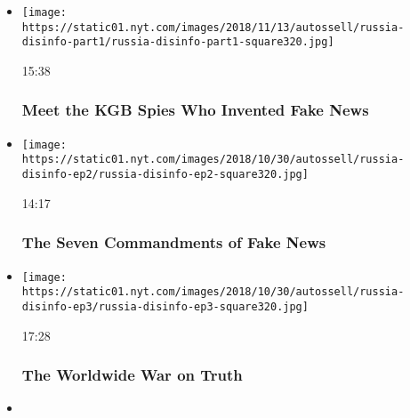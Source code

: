 \begin{itemize}
\item
  \href{https://www.nytimes.com/video/opinion/100000006210828/russia-disinformation-fake-news.html?action=click\&module=video-series-bar\&region=header\&pgtype=Article\&playlistId=video/opinion}{}

  \texttt{[image: https://static01.nyt.com/images/2018/11/13/autossell/russia-disinfo-part1/russia-disinfo-part1-square320.jpg]}

  15:38

  \hypertarget{meet-the-kgb-spies-who-invented-fake-news}{%
  \subsubsection{Meet the KGB Spies Who Invented Fake
  News}\label{meet-the-kgb-spies-who-invented-fake-news}}
\item
  \href{https://www.nytimes.com/video/opinion/100000006188102/what-is-pizzagate.html?action=click\&module=video-series-bar\&region=header\&pgtype=Article\&playlistId=video/opinion}{}

  \texttt{[image: https://static01.nyt.com/images/2018/10/30/autossell/russia-disinfo-ep2/russia-disinfo-ep2-square320.jpg]}

  14:17

  \hypertarget{the-seven-commandments-of-fake-news}{%
  \subsubsection{The Seven Commandments of Fake
  News}\label{the-seven-commandments-of-fake-news}}
\item
  \href{https://www.nytimes.com/video/opinion/100000006188105/countering-disinformation-active-measures.html?action=click\&module=video-series-bar\&region=header\&pgtype=Article\&playlistId=video/opinion}{}

  \texttt{[image: https://static01.nyt.com/images/2018/10/30/autossell/russia-disinfo-ep3/russia-disinfo-ep3-square320.jpg]}

  17:28

  \hypertarget{the-worldwide-war-on-truth}{%
  \subsubsection{The Worldwide War on
  Truth}\label{the-worldwide-war-on-truth}}
\item
  \href{https://www.nytimes.com/video/opinion/100000007278127/coronavirus-vaccine-update.html?action=click\&module=video-series-bar\&region=header\&pgtype=Article\&playlistId=video/opinion}{}


\end{itemize}
